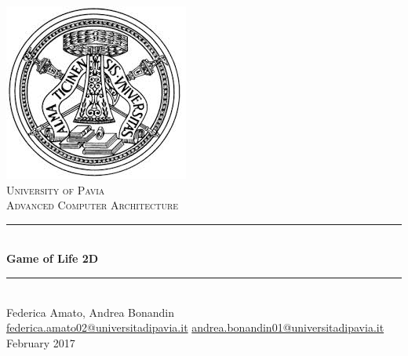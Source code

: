 \documentclass{report}
\begin{document}
\begin{titlepage}
	\centering
	\includegraphics[scale = 0.4]{logo.jpeg}\\[1.0 cm]
	\textsc{\LARGE University of Pavia}\\[1.0 cm]
	\textsc{\Large Advanced Computer Architecture}\\[0.5 cm]
	\rule{\linewidth}{0.2 mm} \\[0.4 cm]
	{\huge{\textbf{Game of Life 2D}}}\\
	\rule{\linewidth}{0.2 mm} \\[1 cm]

	{\large Federica Amato, Andrea Bonandin} \\[0.2 cm]
	\url{federica.amato02@universitadipavia.it}
	\url{andrea.bonandin01@universitadipavia.it} \\[0.2 cm]
	{February 2017}

	
\end{titlepage}

\date{February 2017}
\tableofcontents
\end{document}
